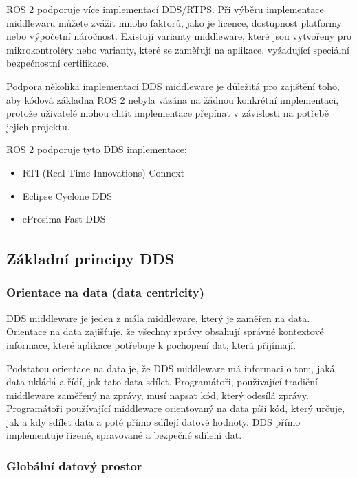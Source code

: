 ROS 2 podporuje více implementací \acs{DDS}/RTPS. Při výběru implementace middlewaru můžete zvážit mnoho faktorů, jako je licence, dostupnost platformy nebo výpočetní náročnost. Existují varianty middleware, které jsou vytvořeny pro mikrokontroléry nebo varianty, které se zaměřují na aplikace, vyžadující speciální bezpečnostní certifikace.

Podpora několika implementací \acs{DDS} middleware je důležitá pro zajištění toho, aby kódová základna ROS 2 nebyla vázána na žádnou konkrétní implementaci, protože uživatelé mohou chtít implementace přepínat v závislosti na potřebě jejich projektu. \cite{ROS2DDS2}

ROS 2 podporuje tyto \acs{DDS} implementace:
\begin{itemize}
    \item RTI (Real-Time Innovations) Connext
    \item Eclipse Cyclone DDS
    \item eProsima Fast DDS
\end{itemize}

\subsection{Základní principy DDS\texorpdfstring{\textsuperscript{\textregistered}}{ (R)}}
\subsubsection{Orientace na data (data centricity)}

\acs{DDS} middleware je jeden z mála middleware, který je zaměřen na data. Orientace na data zajišťuje, že všechny zprávy obsahují správné kontextové informace, které aplikace potřebuje k pochopení dat, která přijímají.

Podstatou orientace na data je, že \acs{DDS} middleware má informaci o tom, jaká data ukládá a řídí, jak tato data sdílet. Programátoři, používající tradiční middleware zaměřený na zprávy, musí napsat kód, který odesílá zprávy. Programátoři používající middleware orientovaný na data píší kód, který určuje, jak a kdy sdílet data a poté přímo sdílejí datové hodnoty. \acs{DDS} přímo implementuje řízené, spravované a bezpečné sdílení dat. \cite{DDS_Main}

\subsubsection{Globální datový prostor}

